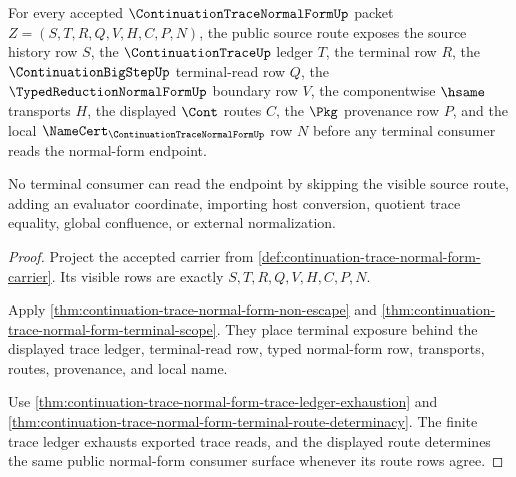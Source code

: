 \begin{theorem}
\label{thm:continuation-trace-normal-form-visible-source-route}
For every accepted $\ContinuationTraceNormalFormUp$ packet $Z=(S,T,R,Q,V,H,C,P,N)$, the public source route exposes the source history row $S$, the $\ContinuationTraceUp$ ledger $T$, the terminal row $R$, the $\ContinuationBigStepUp$ terminal-read row $Q$, the $\TypedReductionNormalFormUp$ boundary row $V$, the componentwise $\hsame$ transports $H$, the displayed $\Cont$ routes $C$, the $\Pkg$ provenance row $P$, and the local $\NameCert_{\ContinuationTraceNormalFormUp}$ row $N$ before any terminal consumer reads the normal-form endpoint.

No terminal consumer can read the endpoint by skipping the visible source route, adding an evaluator coordinate, importing host conversion, quotient trace equality, global confluence, or external normalization.
\end{theorem}
\begin{proof}
Project the accepted carrier from \autoref{def:continuation-trace-normal-form-carrier}. Its visible rows are exactly $S,T,R,Q,V,H,C,P,N$.

Apply \autoref{thm:continuation-trace-normal-form-non-escape} and \autoref{thm:continuation-trace-normal-form-terminal-scope}. They place terminal exposure behind the displayed trace ledger, terminal-read row, typed normal-form row, transports, routes, provenance, and local name.

Use \autoref{thm:continuation-trace-normal-form-trace-ledger-exhaustion} and \autoref{thm:continuation-trace-normal-form-terminal-route-determinacy}. The finite trace ledger exhausts exported trace reads, and the displayed route determines the same public normal-form consumer surface whenever its route rows agree.
\end{proof}

